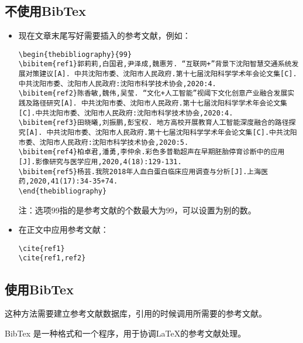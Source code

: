 \documentclass{report}
\begin{document}
\subsection{不使用BibTex}
\begin{itemize}
\item 现在文章末尾写好需要插入的参考文献，例如：

\begin{verbatim}
\begin{thebibliography}{99}
\bibitem{ref1}郭莉莉,白国君,尹泽成,魏惠芳. “互联网+”背景下沈阳智慧交通系统发展对策建议[A]. 中共沈阳市委、沈阳市人民政府.第十七届沈阳科学学术年会论文集[C].中共沈阳市委、沈阳市人民政府:沈阳市科学技术协会,2020:4. 
\bibitem{ref2}陈香敏,魏伟,吴莹. “文化+人工智能”视阈下文化创意产业融合发展实践及路径研究[A]. 中共沈阳市委、沈阳市人民政府.第十七届沈阳科学学术年会论文集[C].中共沈阳市委、沈阳市人民政府:沈阳市科学技术协会,2020:4. 
\bibitem{ref3}田晓曦,刘振鹏,彭宝权. 地方高校开展教育人工智能深度融合的路径探究[A]. 中共沈阳市委、沈阳市人民政府.第十七届沈阳科学学术年会论文集[C].中共沈阳市委、沈阳市人民政府:沈阳市科学技术协会,2020:5. 
\bibitem{ref4}柏卓君,潘勇,李仲余.彩色多普勒超声在早期胚胎停育诊断中的应用[J].影像研究与医学应用,2020,4(18):129-131. 
\bibitem{ref5}杨芸.我院2018年人血白蛋白临床应用调查与分析[J].上海医药,2020,41(17):34-35+74. 
\end{thebibliography}
\end{verbatim}

注：选项99指的是参考文献的个数最大为99，可以设置为别的数。
	
\item 在正文中应用参考文献：
\begin{verbatim}
\cite{ref1}
\cite{ref1,ref2}
\end{verbatim}

\end{itemize}

\subsection{使用BibTex}
这种方法需要建立参考文献数据库，引用的时候调用所需要的参考文献。

BibTex 是一种格式和一个程序，用于协调\LaTeX 的参考文献处理。
\end{document}
